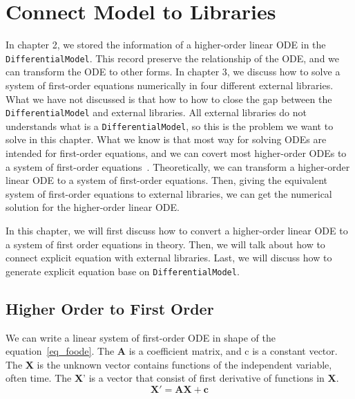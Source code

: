 \chapter{Connect Model to Libraries}
In chapter 2, we stored the information of a higher-order linear ODE in the \verb|DifferentialModel|. This record preserve the relationship of the ODE, and we can transform the ODE to other forms. In chapter 3, we discuss how to solve a system of first-order equations numerically in four different external libraries. What we have not discussed is that how to how to close the gap between the \verb|DifferentialModel| and external libraries. All external libraries do not understands what is a \verb|DifferentialModel|, so this is the problem we want to solve in this chapter. What we know is that most way for solving ODEs are intended for first-order equations, and we can covert most higher-order ODEs to a system of first-order equations~\citep{converthigherode}. 
Theoretically, we can transform a higher-order linear ODE to a system of first-order equations. Then, giving the equivalent system of first-order equations to external libraries, we can get the numerical solution for the higher-order linear ODE.

In this chapter, we will first discuss how to convert a higher-order linear ODE to a system of first order equations in theory. Then, we will talk about how to connect explicit equation with external libraries. Last, we will discuss how to generate explicit equation base on \verb|DifferentialModel|.

\section{Higher Order to First Order}
We can write a linear system of first-order ODE in shape of the equation~\ref{eq_foode}. The \textbf{A} is a coefficient matrix, and c is a constant vector. The \textbf{X} is the unknown vector contains functions of the independent variable, often time. The \textbf{X}' is a vector that consist of first derivative of functions in \textbf{X}.
\begin{equation} \label{eq_foode}
    \boldsymbol{X}' = \boldsymbol{AX} + \boldsymbol{c}
\end{equation}


